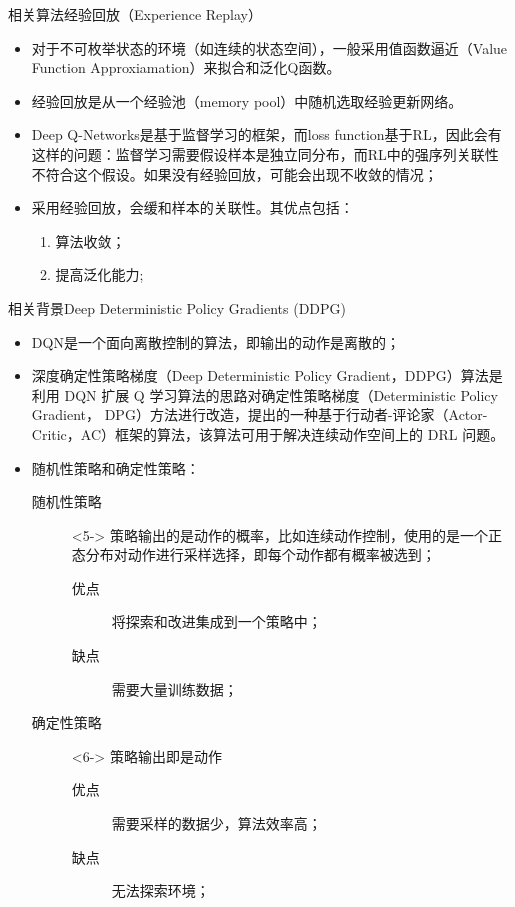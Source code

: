\documentclass[10pt]{beamer}
\begin{document}
	\begin{frame}{相关算法}{经验回放（Experience Replay）}
		\begin{itemize}
			\item<2-> 对于不可枚举状态的环境（如连续的状态空间），一般采用值函数逼近（Value Function Approxiamation）来拟合和泛化Q函数。
			
			\item<3-> 经验回放是从一个经验池（memory pool）中随机选取经验更新网络。
			
			\item<4-> Deep Q-Networks\cite{Hasselt16:DQN}是基于监督学习的框架，而loss function基于RL，因此会有这样的问题：监督学习需要假设样本是独立同分布，而RL中的强序列关联性不符合这个假设。如果没有经验回放，可能会出现不收敛的情况；
			
			\item<5-> 采用经验回放，会缓和样本的关联性。其优点包括：
				\begin{enumerate}
					\item 算法收敛；
					\item 提高泛化能力;
				\end{enumerate}
		\end{itemize}
	\end{frame}

	\begin{frame}{相关背景}{Deep Deterministic Policy Gradients (DDPG)}
		\begin{itemize}
			\item<2-> DQN是一个面向离散控制的算法，即输出的动作是离散的；
			
			\item<3-> 深度确定性策略梯度（Deep Deterministic Policy Gradient，DDPG）算法\cite{Chou17:DDPG}是利用 DQN 扩展 Q 学习算法的思路对确定性策略梯度（Deterministic Policy Gradient， DPG）方法进行改造，提出的一种基于行动者-评论家（Actor-Critic，AC）框架的算法，该算法可用于解决连续动作空间上的 DRL 问题。
			
			\item<4-> 随机性策略和确定性策略：
				\begin{description}
					\item[随机性策略]<5-> 策略输出的是动作的概率，比如连续动作控制，使用的是一个正态分布对动作进行采样选择，即每个动作都有概率被选到；
						\begin{description}
							\item[优点] 将探索和改进集成到一个策略中；
							\item[缺点] 需要大量训练数据；
						\end{description}
					
					\item [确定性策略]<6-> 策略输出即是动作
						\begin{description}
							\item[优点] 需要采样的数据少，算法效率高；
							\item[缺点] 无法探索环境；
						\end{description}
				\end{description}
			
		\end{itemize}
	\end{frame}
	
\end{document}
